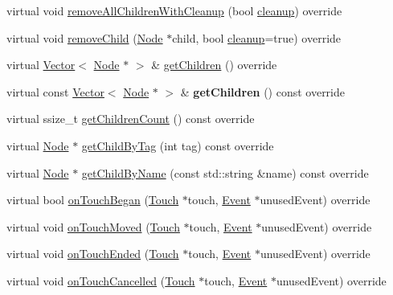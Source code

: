 \begin{DoxyCompactItemize}
virtual void \hyperlink{classui_1_1ScrollView_ab72a5f9a41f99b6b8c41596bacdd116f}{remove\+All\+Children\+With\+Cleanup} (bool \hyperlink{classProtectedNode_a5462a6202b458193c1881bcdcc5be78d}{cleanup}) override
\item 
virtual void \hyperlink{classui_1_1ScrollView_ae3b50790cd7fa0feeacc9204fe86fc1a}{remove\+Child} (\hyperlink{classNode}{Node} $\ast$child, bool \hyperlink{classProtectedNode_a5462a6202b458193c1881bcdcc5be78d}{cleanup}=true) override
\item 
virtual \hyperlink{classVector}{Vector}$<$ \hyperlink{classNode}{Node} $\ast$ $>$ \& \hyperlink{classui_1_1ScrollView_adf13c7fc4c49dc4030dd4482f7de62b7}{get\+Children} () override
\item 
\mbox{\label{classui_1_1ScrollView_ae901f4f7ad0d107278e0e0b065ee8045}} 
virtual const \hyperlink{classVector}{Vector}$<$ \hyperlink{classNode}{Node} $\ast$ $>$ \& {\bfseries get\+Children} () const override
\item 
virtual ssize\+\_\+t \hyperlink{classui_1_1ScrollView_a129cd98a1960479ab18dd43486ed0856}{get\+Children\+Count} () const override
\item 
virtual \hyperlink{classNode}{Node} $\ast$ \hyperlink{classui_1_1ScrollView_a0b4781b276e8040776a7ec93eb54792e}{get\+Child\+By\+Tag} (int tag) const override
\item 
virtual \hyperlink{classNode}{Node} $\ast$ \hyperlink{classui_1_1ScrollView_ab61ab552b7ea1fb1ebff43f34441a876}{get\+Child\+By\+Name} (const std\+::string \&name) const override
\item 
virtual bool \hyperlink{classui_1_1ScrollView_a04c7e9105bf26f9d79cd907c6b23f41d}{on\+Touch\+Began} (\hyperlink{classTouch}{Touch} $\ast$touch, \hyperlink{classEvent}{Event} $\ast$unused\+Event) override
\item 
virtual void \hyperlink{classui_1_1ScrollView_a14d0d7bcb1061ba38fa9b0d2d1715b1c}{on\+Touch\+Moved} (\hyperlink{classTouch}{Touch} $\ast$touch, \hyperlink{classEvent}{Event} $\ast$unused\+Event) override
\item 
virtual void \hyperlink{classui_1_1ScrollView_a3bb1022184ffae6a9fc2e4f0668cddab}{on\+Touch\+Ended} (\hyperlink{classTouch}{Touch} $\ast$touch, \hyperlink{classEvent}{Event} $\ast$unused\+Event) override
\item 
virtual void \hyperlink{classui_1_1ScrollView_aacfac8af19ae8315530e969897d1217a}{on\+Touch\+Cancelled} (\hyperlink{classTouch}{Touch} $\ast$touch, \hyperlink{classEvent}{Event} $\ast$unused\+Event) override

\end{DoxyCompactItemize}
